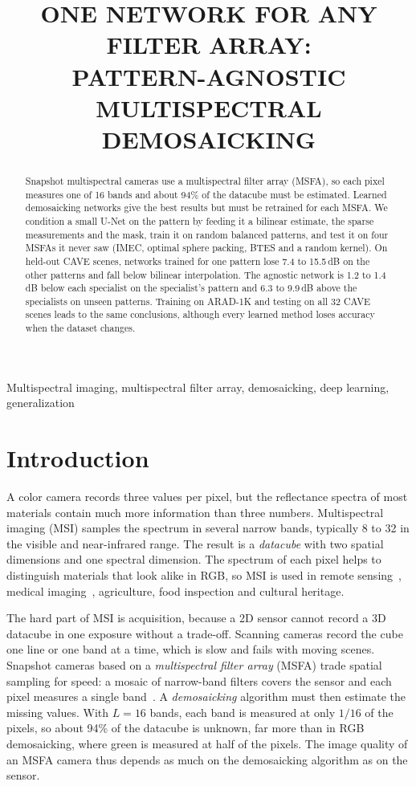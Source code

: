\documentclass{article}
\title{ONE NETWORK FOR ANY FILTER ARRAY:\\
  PATTERN-AGNOSTIC MULTISPECTRAL DEMOSAICKING}
\begin{document}
%
\maketitle
%
\begin{abstract}
Snapshot multispectral cameras use a multispectral filter array (MSFA), so
each pixel measures one of 16 bands and about 94\% of the datacube must be
estimated. Learned demosaicking networks give the best results but must be
retrained for each MSFA. We condition a small U-Net on the pattern by
feeding it a bilinear estimate, the sparse measurements and the mask, train
it on random balanced patterns, and test it on four MSFAs it never saw
(IMEC, optimal sphere packing, BTES and a random kernel). On held-out CAVE
scenes, networks trained for one pattern lose 7.4 to 15.5\,dB on the other
patterns and fall below bilinear interpolation. The agnostic network is 1.2
to 1.4\,dB below each specialist on the specialist's pattern and 6.3 to
9.9\,dB above the specialists on unseen patterns. Training on ARAD-1K and
testing on all 32 CAVE scenes leads to the same conclusions, although every
learned method loses accuracy when the dataset changes.
\end{abstract}
%
\begin{keywords}
Multispectral imaging, multispectral filter array, demosaicking, deep
learning, generalization
\end{keywords}
%
\section{Introduction}
\label{sec:intro}

A color camera records three values per pixel, but the reflectance spectra
of most materials contain much more information than three numbers.
Multispectral imaging (MSI) samples the spectrum in several narrow bands,
typically 8 to 32 in the visible and near-infrared range. The result is a
\emph{datacube} with two spatial dimensions and one spectral dimension. The
spectrum of each pixel helps to distinguish materials that look alike in RGB,
so MSI is used in remote sensing~\cite{diaz2023}, medical
imaging~\cite{lu2014}, agriculture, food inspection and cultural heritage.

The hard part of MSI is acquisition, because a 2D sensor cannot record a 3D
datacube in one exposure without a trade-off. Scanning cameras record the cube one line
or one band at a time, which is slow and fails with moving scenes. Snapshot
cameras based on a \emph{multispectral filter array} (MSFA) trade spatial
sampling for speed: a mosaic of narrow-band filters covers the sensor and each
pixel measures a single band~\cite{lapray2014,geelen2014}. A
\emph{demosaicking} algorithm must then estimate the missing values. With
$L=16$ bands, each band is measured at only $1/16$ of the pixels, so about
94\% of the datacube is unknown, far more than in RGB demosaicking, where
green is measured at half of the pixels. The image quality of an MSFA camera
thus depends as much on the demosaicking algorithm as on the sensor.
\end{document}
